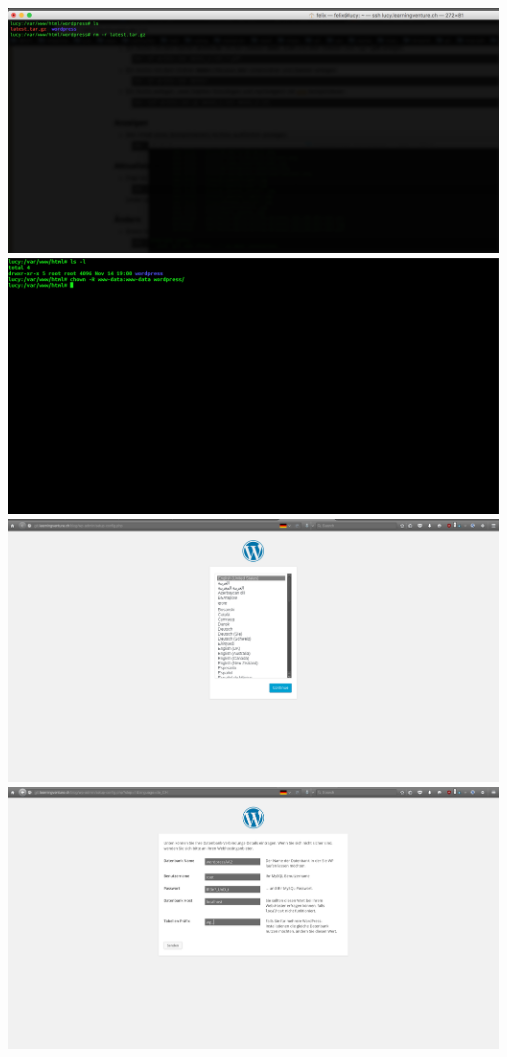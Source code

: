 \documentclass{article}
\begin{document}
	\newline
	\includegraphics[width=13cm]{../Pics/34-wordpress-download-file-remove}
	\newline
	\includegraphics[width=13cm]{../Pics/35-wordpress-permissions}
	\newline
	\includegraphics[width=13cm]{../Pics/36-wordpress-konfbildschirm}
	\newline
	\includegraphics[width=13cm]{../Pics/37-wordpress-datenbank}
\end{document}
